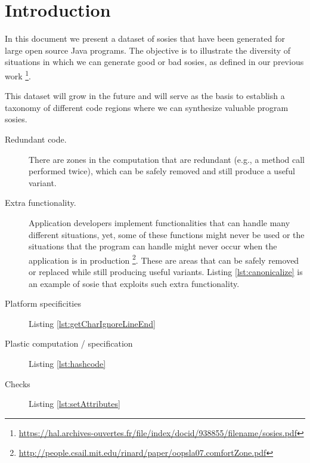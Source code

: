 \section{Introduction}

In this document we present a dataset of sosies that have been generated for large open source Java programs. 
The objective is to illustrate the diversity of situations in which we can generate good or bad sosies, as defined in our previous work \footnote{\url{https://hal.archives-ouvertes.fr/file/index/docid/938855/filename/sosies.pdf}}. 

This dataset will grow in the future and will serve as the basis to establish a taxonomy of different code regions where we can synthesize valuable program sosies. 

\begin{description}
  \item [Redundant code.] There are zones in the computation that are redundant (e.g., a method call performed twice), which can be safely removed and still produce a useful variant.
  \item [Extra functionality.] Application developers implement functionalities that can handle many different situations, yet, some of these functions might never be used or the situations that the program can handle might never occur when the application is in production \footnote{\url{http://people.csail.mit.edu/rinard/paper/oopsla07.comfortZone.pdf}}. These are areas that can be safely removed or replaced while still producing useful variants. Listing \ref{lst:canonicalize} is an example of sosie that exploits such extra functionality.
  \item [Platform specificities] Listing \ref{lst:getCharIgnoreLineEnd}
  \item [Plastic computation / specification] Listing \ref{lst:hashcode}
  \item [Checks] Listing \ref{lst:setAttributes}
\end{description}